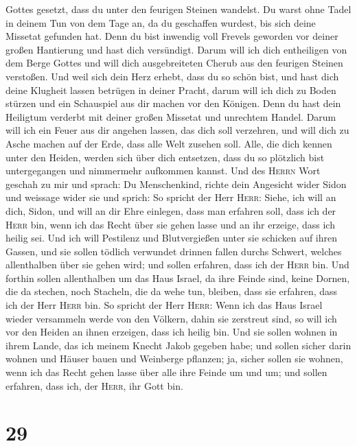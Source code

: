 Gottes gesetzt, dass du unter den feurigen Steinen wandelst.
 Du warst ohne Tadel in deinem Tun von dem Tage an, da du
geschaffen wurdest, bis sich deine Missetat gefunden hat.
 Denn du bist inwendig voll Frevels geworden vor deiner
großen Hantierung und hast dich versündigt. Darum will ich dich
entheiligen von dem Berge Gottes und will dich ausgebreiteten Cherub aus
den feurigen Steinen verstoßen.  Und weil sich dein Herz
erhebt, dass du so schön bist, und hast dich deine Klugheit lassen
betrügen in deiner Pracht, darum will ich dich zu Boden stürzen und ein
Schauspiel aus dir machen vor den Königen.  Denn du hast
dein Heiligtum verderbt mit deiner großen Missetat und unrechtem Handel.
Darum will ich ein Feuer aus dir angehen lassen, das dich soll
verzehren, und will dich zu Asche machen auf der Erde, dass alle Welt
zusehen soll.  Alle, die dich kennen unter den Heiden,
werden sich über dich entsetzen, dass du so plötzlich bist untergegangen
und nimmermehr aufkommen kannst.  Und des \textsc{Herrn}
Wort geschah zu mir und sprach:  Du Menschenkind, richte
dein Angesicht wider Sidon und weissage wider sie  und
sprich: So spricht der Herr \textsc{Herr}: Siehe, ich will an dich,
Sidon, und will an dir Ehre einlegen, dass man erfahren soll, dass ich
der \textsc{Herr} bin, wenn ich das Recht über sie gehen lasse und an
ihr erzeige, dass ich heilig sei.  Und ich will Pestilenz
und Blutvergießen unter sie schicken auf ihren Gassen, und sie sollen
tödlich verwundet drinnen fallen durchs Schwert, welches allenthalben
über sie gehen wird; und sollen erfahren, dass ich der \textsc{Herr}
bin.  Und forthin sollen allenthalben um das Haus Israel,
da ihre Feinde sind, keine Dornen, die da stechen, noch Stacheln, die da
wehe tun, bleiben, dass sie erfahren, dass ich der Herr \textsc{Herr}
bin.  So spricht der Herr \textsc{Herr}: Wenn ich das
Haus Israel wieder versammeln werde von den Völkern, dahin sie zerstreut
sind, so will ich vor den Heiden an ihnen erzeigen, dass ich heilig bin.
Und sie sollen wohnen in ihrem Lande, das ich meinem Knecht Jakob
gegeben habe;  und sollen sicher darin wohnen und Häuser
bauen und Weinberge pflanzen; ja, sicher sollen sie wohnen, wenn ich das
Recht gehen lasse über alle ihre Feinde um und um; und sollen erfahren,
dass ich, der \textsc{Herr}, ihr Gott bin.

\hypertarget{section-28}{%
\section{29}\label{section-28}}

